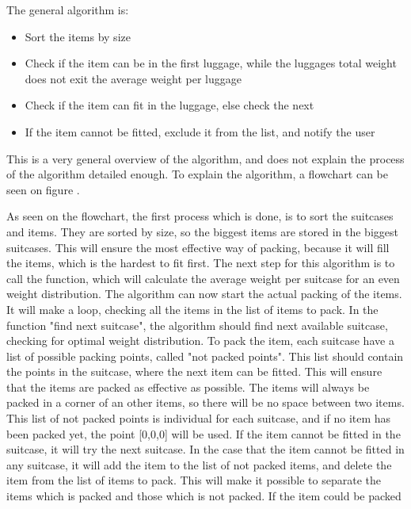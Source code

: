 The general algorithm is:
\begin{itemize}
	\item Sort the items by size
	\item Check if the item can be in the first luggage, while the luggages total weight does not exit the average weight per luggage
	\item	Check if the item can fit in the luggage, else check the next
	\item  If the item cannot be fitted, exclude it from the list, and notify the user
\end{itemize}

This is a very general overview of the algorithm, and does not explain the process of the algorithm detailed enough. To explain the algorithm, a flowchart can be seen on figure .

As seen on the flowchart, the first process which is done, is to sort the suitcases and items. They are sorted by size, so the biggest items are stored in the biggest suitcases. This will ensure the most effective way of packing, because it will fill the items, which is the hardest to fit first. The next step for this algorithm is to call the function, which will calculate the average weight per suitcase for an even weight distribution. The algorithm can now start the actual packing of the items.
It will make a loop, checking all the items in the list of items to pack. In the function "find next suitcase", the algorithm should find next available suitcase, checking for optimal weight distribution. To pack the item, each suitcase have a list of possible packing points, called "not packed points". This list should contain the points in the suitcase, where the next item can be fitted. This will ensure that the items are packed as effective as possible. The items will always be packed in a corner of an other items, so there will be no space between two items. This list of not packed points is individual for each suitcase, and if no item has been packed yet, the point [0,0,0] will be used. If the item cannot be fitted in the suitcase, it will try the next suitcase. In the case that the item cannot be fitted in any suitcase, it will add the item to the list of not packed items, and delete the item from the list of items to pack. This will make it possible to separate the items which is packed and those which is not packed. If the item could be packed